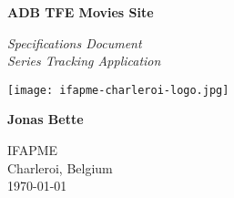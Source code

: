 \begin{titlepage}
    \begin{center}
        \vspace*{1cm}

        \textbf{ADB TFE Movies Site}

        \vspace{0.5cm}

        \textit{Specifications Document \\ \large Series Tracking Application}

        \vfill

        \texttt{[image: ifapme-charleroi-logo.jpg]}

        \vfill

        \textbf{Jonas Bette}

        \vspace{1.5cm}

        IFAPME \\
        Charleroi, Belgium \\
        \today
    \end{center}
\end{titlepage}
